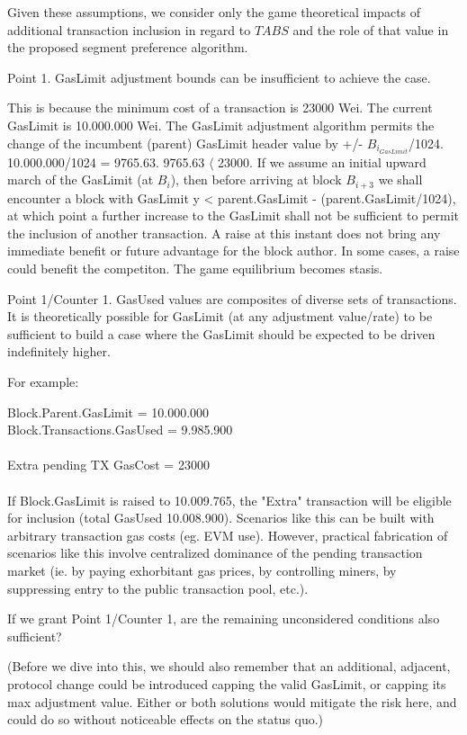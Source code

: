 \documentclass[11pt]{article}
\theoremstyle{plain}
\begin{document}
Given these assumptions, we consider only the game theoretical impacts of
additional transaction inclusion
in regard to $TABS$ and the role of that value in the proposed segment
preference algorithm.

Point 1. GasLimit adjustment bounds can be insufficient to achieve the case.

This is because the minimum cost of a transaction is 23000 Wei.
The current GasLimit is 10.000.000 Wei.
The GasLimit adjustment algorithm permits the change of the incumbent (parent)
GasLimit header value by +/- $B_{i}_{GasLimit}$/1024.
10.000.000/1024 = 9765.63.
9765.63 $\langle$ 23000.
If we assume an initial upward march of the GasLimit (at $B_{i}$), then before
arriving at block $B_{i+3}$ we shall encounter a
block with GasLimit y < parent.GasLimit - (parent.GasLimit/1024), at which
point a further increase to the GasLimit
shall not be sufficient to permit the inclusion of another transaction.
A raise at this instant does not bring any immediate benefit or future
advantage for the block author. In some cases, a raise could benefit the
competiton.
The game equilibrium becomes stasis.

Point 1/Counter 1. GasUsed values are composites of diverse sets of
transactions. It is theoretically possible for GasLimit (at any adjustment
value/rate) to be sufficient to build a case where
the GasLimit should be expected to be driven indefinitely higher. 

For example:

Block.Parent.GasLimit     = 10.000.000 \\
Block.Transactions.GasUsed = 9.985.900 \\
\\
Extra pending TX GasCost = 23000 \\
\\
If Block.GasLimit is raised to 10.009.765, the "Extra" transaction will be
eligible for inclusion (total GasUsed 10.008.900).
Scenarios like this can be built with arbitrary transaction gas costs (eg. EVM
use).
However, practical fabrication of scenarios like this involve centralized
dominance of the pending transaction market (ie. by paying exhorbitant gas
prices, by controlling miners, by suppressing entry to the public transaction
pool, etc.).

If we grant Point 1/Counter 1, are the remaining unconsidered conditions also
sufficient?

(Before we dive into this, we should also remember that an additional,
adjacent, protocol change could be introduced capping the valid GasLimit, or
capping its max adjustment value. Either or both solutions would mitigate the
risk here, and could do so without noticeable effects on the status quo.)
\end{document}
